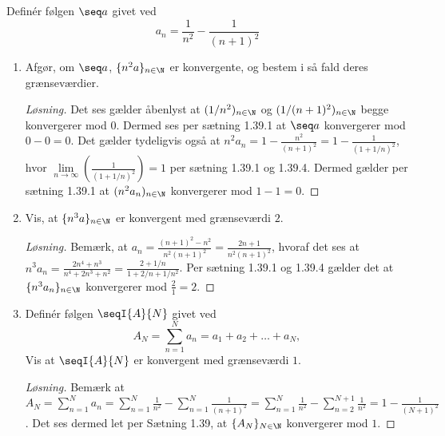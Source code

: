 \begin{opg}
Definér følgen $\seq a$ givet ved
    $$ a_n = \frac{1}{n^2} - \frac{1}{(n+1)^2} $$
\begin{enumerate}
    \item Afgør, om $\seq a$, $\{n^2a\}_{n\in \N}$ er konvergente, og bestem i så fald deres grænseværdier.
    
    \ifanswers \begin{proof}[Løsning]
    	Det ses gælder åbenlyst at $ (1/n^2)_{n\in\N} $ og $ (1/(n+1)^2)_{n\in\N} $ begge konvergerer mod $ 0 $. Dermed ses per sætning 1.39.1 at $ \seq a $ konvergerer mod $ 0-0=0 $. Det gælder tydeligvis også at $ n^2a_n=1-\frac{n^2}{(n+1)^2}=1-\frac{1}{(1+1/n)^2} $, hvor $ \lim\limits_{n\to\infty}\left(\frac{1}{(1+1/n)^2}\right)=1 $ per sætning 1.39.1 og 1.39.4. Dermed gælder per sætning 1.39.1 at $ (n^2a_n)_{n\in\N} $ konvergerer mod $ 1-1=0 $.
    \end{proof} \fi
    
    
    \item Vis, at $\{n^3a\}_{n\in\N}$ er konvergent med grænseværdi $2$.
    \ifanswers \begin{proof}[Løsning]
    	Bemærk, at $ a_n=\frac{(n+1)^2-n^2}{n^2(n+1)^2}=\frac{2n+1}{n^2(n+1)^2} $, hvoraf det ses at $ n^3a_n=\frac{2n^4+n^3}{n^4+2n^3+n^2}=\frac{2+1/n}{1+2/n+1/n^2} $. Per sætning 1.39.1 og 1.39.4 gælder det at $ \{n^3a_n\}_{n\in\N} $ konvergerer mod $ \frac{2}{1}=2 $.
    \end{proof} \fi
    
    \item Definér følgen $\seqI{A}{N}$ givet ved
    $$ A_N = \sum_{n=1}^N a_n = a_1 + a_2 + \ldots + a_N, $$
    Vis at $\seqI{A}{N}$ er konvergent med grænseværdi $1$.
    \ifanswers \begin{proof}[Løsning]
    	Bemærk at $ A_N=\sum_{n=1}^{N}a_n=\sum_{n=1}^{N}\frac{1}{n^2}-\sum_{n=1}^{N}\frac{1}{(n+1)^2}=\sum_{n=1}^{N}\frac{1}{n^2}-\sum_{n=2}^{N+1}\frac{1}{n^2}=1-\frac{1}{(N+1)^2} $. Det ses dermed let per Sætning 1.39, at $ \{A_N\}_{N\in \N} $ konvergerer mod $ 1 $.
    \end{proof} \fi
\end{enumerate}
\end{opg}

